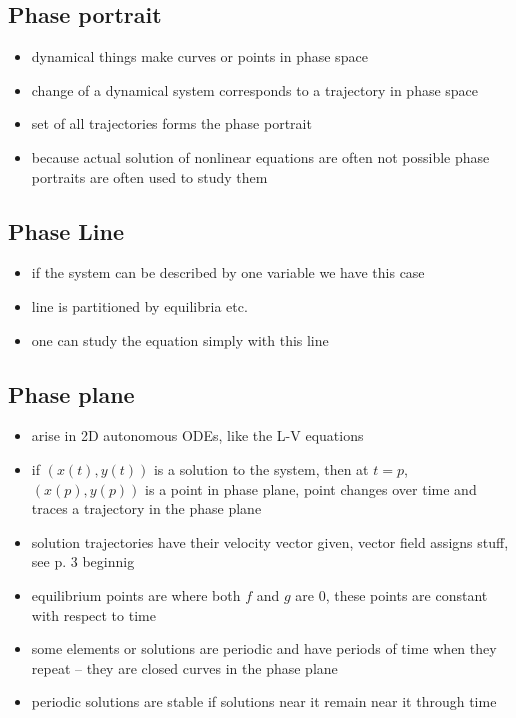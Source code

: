 \documentclass[a4paper,reqno,11pt]{article}
\begin{document}
\subsection{Phase portrait}

\begin{itemize}
    \item dynamical things make curves or points in phase space
    \item change of a dynamical system corresponds to a trajectory in phase
        space
    \item set of all trajectories forms the phase portrait
    \item because actual solution of nonlinear equations are often not possible
        phase portraits are often used to study them
\end{itemize}

\subsection{Phase Line}

\begin{itemize}
    \item if the system can be described by one variable we have this case
    \item line is partitioned by equilibria etc.
    \item one can study the equation simply with this line
\end{itemize}

\subsection{Phase plane}

\begin{itemize}
    \item arise in 2D autonomous ODEs, like the L-V equations
    \item if $(x(t), y(t))$ is a solution to the system, then at $t=p$,
        $(x(p),y(p))$ is a point in phase plane, point changes over time and
        traces a trajectory in the phase plane
    \item solution trajectories have their velocity vector given, vector field
        assigns stuff, see p. 3 beginnig
    \item equilibrium points are where both $f$ and $g$ are 0, these points are
        constant with respect to time
    \item some elements or solutions are periodic and have periods of time when
        they repeat -- they are closed curves in the phase plane
    \item periodic solutions are stable if solutions near it remain near it
        through time
\end{itemize}
\end{document}
